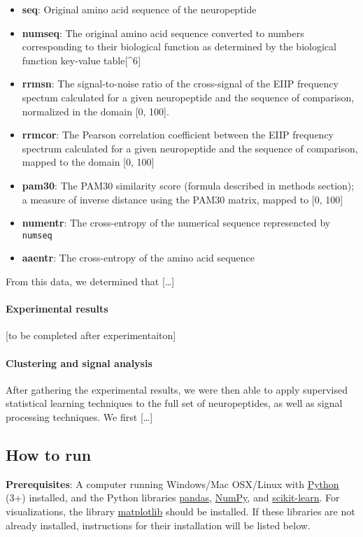 \documentclass[]{article}
\providecommand{\tightlist}{%
	\setlength{\itemsep}{0pt}\setlength{\parskip}{0pt}}
\let\oldparagraph\paragraph
\renewcommand{\paragraph}[1]{\oldparagraph{#1}\mbox{}}
\begin{document}
	\begin{itemize}
		\tightlist
		\item
		\textbf{seq}: Original amino acid sequence of the neuropeptide
		\item
		\textbf{numseq}: The original amino acid sequence converted to numbers
		corresponding to their biological function as determined by the
		biological function key-value table{[}\^{}6{]}
		\item
		\textbf{rrmsn}: The signal-to-noise ratio of the cross-signal of the
		EIIP frequency spectum calculated for a given neuropeptide and the
		sequence of comparison, normalized in the domain {[}0, 100{]}.
		\item
		\textbf{rrmcor}: The Pearson correlation coefficient between the EIIP
		frequency spectrum calculated for a given neuropeptide and the
		sequence of comparison, mapped to the domain {[}0, 100{]}
		\item
		\textbf{pam30}: The PAM30 similarity score (formula described in
		methods section); a measure of inverse distance using the PAM30
		matrix, mapped to {[}0, 100{]}
		\item
		\textbf{numentr}: The cross-entropy of the numerical sequence
		represencted by \texttt{numseq}
		\item
		\textbf{aaentr}: The cross-entropy of the amino acid sequence
	\end{itemize}
	
	From this data, we determined that {[}\ldots{}{]}
	
	\hypertarget{experimental-results-1}{%
		\paragraph{Experimental results}\label{experimental-results-1}}
	
	{[}to be completed after experimentaiton{]}
	
	\hypertarget{clustering-and-signal-analysis}{%
		\paragraph{Clustering and signal
			analysis}\label{clustering-and-signal-analysis}}
	
	After gathering the experimental results, we were then able to apply
	supervised statistical learning techniques to the full set of
	neuropeptides, as well as signal processing techniques. We first
	{[}\ldots{}{]}
	
	\hypertarget{how-to-run}{%
		\subsection{How to run}\label{how-to-run}}
	
	\textbf{Prerequisites}: A computer running Windows/Mac OSX/Linux with
	\href{https://www.python.org/}{Python} (3+) installed, and the Python
	libraries \href{https://pandas.pydata.org/}{pandas},
	\href{https://numpy.org/}{NumPy}, and
	\href{https://scikit-learn.org/stable/}{scikit-learn}. For
	visualizations, the library \href{https://matplotlib.org/}{matplotlib}
	should be installed. If these libraries are not already installed,
	instructions for their installation will be listed below.
\end{document}

